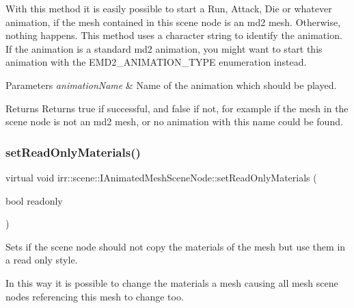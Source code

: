 With this method it is easily possible to start a Run, Attack, Die or whatever animation, if the mesh contained in this scene node is an md2 mesh. Otherwise, nothing happens. This method uses a character string to identify the animation. If the animation is a standard md2 animation, you might want to start this animation with the E\+M\+D2\+\_\+\+A\+N\+I\+M\+A\+T\+I\+O\+N\+\_\+\+T\+Y\+PE enumeration instead. 
\begin{DoxyParams}{Parameters}
{\em animation\+Name} & Name of the animation which should be played. \\
\hline
\end{DoxyParams}
\begin{DoxyReturn}{Returns}
Returns true if successful, and false if not, for example if the mesh in the scene node is not an md2 mesh, or no animation with this name could be found. 
\end{DoxyReturn}
\mbox{\label{classirr_1_1scene_1_1IAnimatedMeshSceneNode_af04e917ab3cae5631b06edad2d8a3a04}} 
\subsubsection{\texorpdfstring{set\+Read\+Only\+Materials()}{setReadOnlyMaterials()}}
{\footnotesize\ttfamily virtual void irr\+::scene\+::\+I\+Animated\+Mesh\+Scene\+Node\+::set\+Read\+Only\+Materials (\begin{DoxyParamCaption}\item[{bool}]{readonly }\end{DoxyParamCaption})\hspace{0.3cm}{\ttfamily [pure virtual]}}



Sets if the scene node should not copy the materials of the mesh but use them in a read only style. 

In this way it is possible to change the materials a mesh causing all mesh scene nodes referencing this mesh to change too. \mbox{\label{classirr_1_1scene_1_1IAnimatedMeshSceneNode_aa3aa695d2e949bbc2ff17429951e77d0}} 
